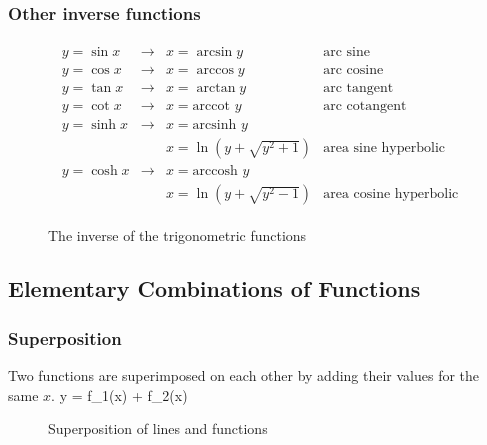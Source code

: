 \subsubsection{Other inverse functions}
\vspace*{-0.9cm} \begin{eqnarray*} \begin{array}{llll}
y=\sin x & \rightarrow & x = \arcsin y & \mbox{arc sine} \\
y=\cos x & \rightarrow & x = \arccos y & \mbox{arc cosine} \\
y=\tan x & \rightarrow & x = \arctan y & \mbox{arc tangent} \\
y=\cot x & \rightarrow & x = \mbox{arccot } y & \mbox{arc cotangent} \\
y=\sinh x & \rightarrow & x = \mbox{arcsinh } y & \\
& & x=\ln(y+\sqrt{y^2+1})
& \mbox{area sine hyperbolic} \\
y=\cosh x & \rightarrow & x = \mbox{arccosh } y & \\
& & x = \ln(y+\sqrt{y^2-1})
& \mbox{area cosine hyperbolic}
\end{array} \end{eqnarray*} \svs

\begin{figure}[!h]
    \centering
    \hspace*{0.5cm}
     \svs
    \caption{The inverse of the trigonometric functions}
\end{figure}

\subsection{Elementary Combinations of Functions}
\subsubsection{Superposition}
Two functions are superimposed on each other by adding their values for the same $x$.
\bnn y = f_1(x) + f_2(x) \enn
\vspace*{-.5cm} \begin{figure}[!h]
    \centering
    \hspace{0.5cm}
     \svs
    \caption{Superposition of lines and functions} \label{fig17}
\end{figure}

